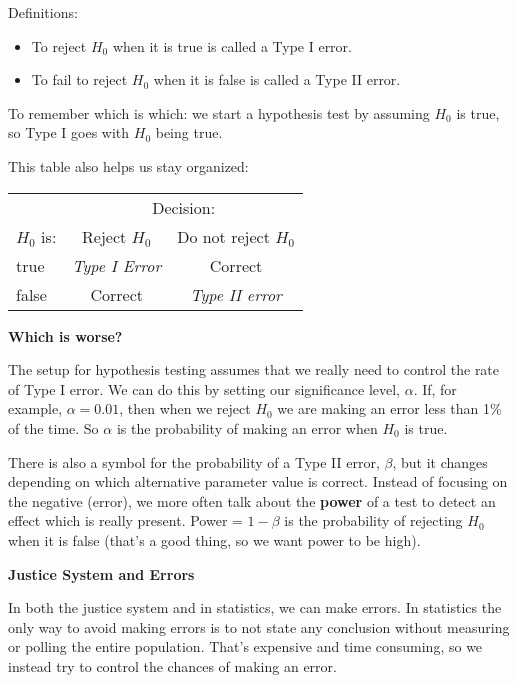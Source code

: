 Definitions:\vspace{-.6cm}
\begin{itemize}
  \item To reject $H_0$ when it is true is called a Type I error.
  \item To fail to reject $H_0$ when it is false is called a Type II error.
\vspace{-.6cm}
\end{itemize}
To remember which is which: we start a hypothesis test by assuming
$H_0$ is true, so Type I goes with $H_0$ being true. 

This table also helps us stay organized: \hfill
\begin{tabular}{|l|c|c|}\hline
   & \multicolumn{2}{|c|}{Decision:} \\
$H_0$ is:  & Reject $H_0$ & Do not reject $H_0$\\\hline
true & {\em Type I Error} & Correct  \\ \hline
false& Correct & {\em Type II error}   \\ \hline\hline
\end{tabular}



{\bf Which is worse?}

The setup for hypothesis testing assumes that we really need to
control the rate of Type I error.  We can do this by setting our
 significance level, $\alpha$.  If, for example, $\alpha = 0.01$, then
 when we reject $H_0$ we are making an error less than 1\% of the time.
So $\alpha$ is the probability of making an error when $H_0$ is true.

There is also a symbol for the probability of a Type II error,
$\beta$, but it changes depending on which alternative parameter
value is correct. Instead of focusing on the negative (error), we
more often talk about the {\bf power} of a test to detect an effect
which is really present.  Power = $1-\beta$ is the probability of
rejecting $H_0$ when it is false (that's a good thing, so we want
power to be high). 



\begin{center}
  {\bf Justice System and Errors }
\end{center}

In both the justice system and in statistics, we can make errors. In
statistics the only way to avoid making errors is to not state any
conclusion without measuring or polling the entire population.  That's
expensive and time consuming, so we instead try to control the chances
of making an error.  
 

